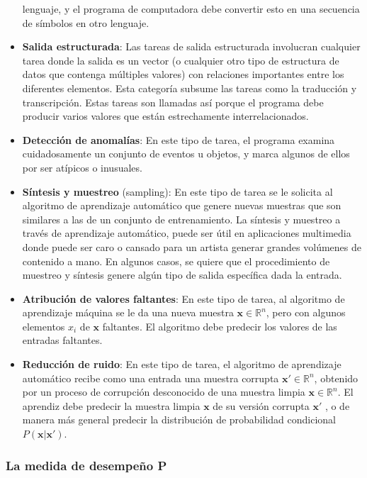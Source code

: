 \begin{itemize}
    lenguaje, y el programa de computadora debe convertir esto en una
    secuencia de símbolos en otro lenguaje.
    \item \textbf{Salida estructurada}: Las tareas de salida estructurada involucran cualquier
    tarea donde la salida es un vector (o cualquier otro tipo de estructura
    de datos que contenga múltiples valores) con relaciones importantes
    entre los diferentes elementos. Esta categoría subsume las tareas
    como la traducción y transcripción. Estas tareas son
    llamadas así porque el programa debe producir varios valores que están
    estrechamente interrelacionados.
    \item  \textbf{Detección de anomalías}: En este tipo de
    tarea, el programa examina cuidadosamente un conjunto de eventos u
    objetos, y marca algunos de ellos por ser atípicos o inusuales.
    \item \textbf{Síntesis y muestreo}
    (sampling): En este tipo de tarea se le solicita al algoritmo de
    aprendizaje automático que genere nuevas muestras que son similares a
    las de un conjunto de entrenamiento. La síntesis y muestreo a través de
    aprendizaje automático, puede ser útil en aplicaciones multimedia donde
    puede ser caro o cansado para un artista generar grandes volúmenes de
    contenido a mano. En algunos casos, se
    quiere que el procedimiento de muestreo y síntesis genere algún tipo de
    salida específica dada la entrada.
    \item \textbf{Atribución de valores faltantes}: En este tipo de tarea, al algoritmo de
    aprendizaje máquina se le da una nueva muestra $\mathbf{x} \in \mathbb{R}^n$, pero con
    algunos elementos $x_i$ de $\mathbf{x}$ faltantes. El algoritmo debe predecir los
    valores de las entradas faltantes. 
    \item \textbf{Reducción de ruido}: En este tipo de
    tarea, el algoritmo de aprendizaje automático recibe como una entrada
    una muestra corrupta $\mathbf{x}' \in \mathbb{R}^n$, obtenido por un proceso de corrupción
    desconocido de una muestra limpia $\mathbf{x} \in \mathbb{R}^n$. El aprendiz debe predecir la
    muestra limpia $\mathbf{x}$ de su versión corrupta $\mathbf{x}'$ , o de manera más general
    predecir la distribución de probabilidad condicional $P(\mathbf{x} | \mathbf{x}')$.


\end{itemize}
    


\subsubsection{La medida de desempeño
P}\label{la-medida-de-desempeuxf1o-p}

